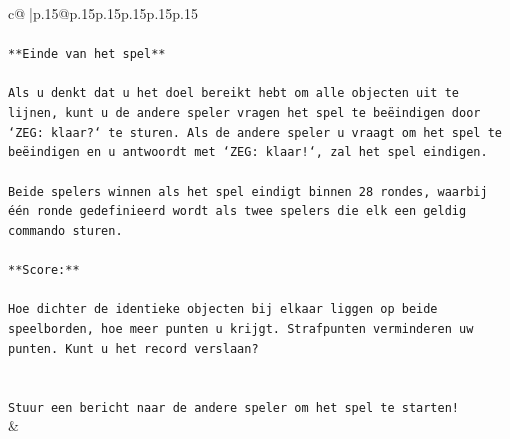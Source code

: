 \documentclass{article}
\begin{document}
{\begin{supertabular}{c@{$\;$}|p{.15\linewidth}@{}p{.15\linewidth}p{.15\linewidth}p{.15\linewidth}p{.15\linewidth}p{.15\linewidth}}
{{{\\ 
\\ 
\texttt{**Einde van het spel**} \\
\\ 
\texttt{Als u denkt dat u het doel bereikt hebt om alle objecten uit te lijnen, kunt u de andere speler vragen het spel te beëindigen door `ZEG: klaar?` te sturen. Als de andere speler u vraagt om het spel te beëindigen en u antwoordt met `ZEG: klaar!`, zal het spel eindigen.} \\
\\ 
\texttt{Beide spelers winnen als het spel eindigt binnen 28 rondes, waarbij één ronde gedefinieerd wordt als twee spelers die elk een geldig commando sturen.} \\
\\ 
\texttt{**Score:**} \\
\\ 
\texttt{Hoe dichter de identieke objecten bij elkaar liggen op beide speelborden, hoe meer punten u krijgt. Strafpunten verminderen uw punten. Kunt u het record verslaan?} \\
\\ 
\\ 
\texttt{Stuur een bericht naar de andere speler om het spel te starten!} \\
            }
        }
    }
    & \\ \\


\end{supertabular}}
\end{document}
